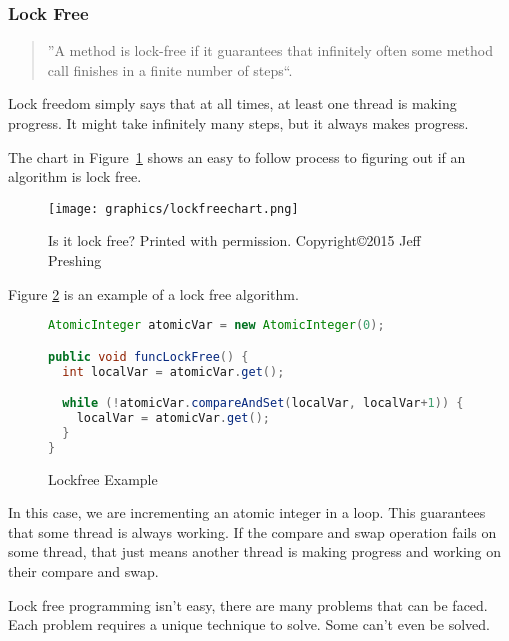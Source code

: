 \documentclass[letterpaper, 11pt]{article}
\begin{document}
\subsubsection{Lock Free}
\begin{quotation}
	''A method is lock-free if it guarantees that infinitely often some method call finishes 
	in a finite number of steps``\citep[p. 60]{artofmulti}.
\end{quotation}

Lock freedom simply says that at all times, at least one thread is making progress. It might 
take infinitely many steps, but it always makes progress.  
\par\vspace{\baselineskip}

The chart in Figure~\ref{lockfreechart} shows an easy to follow process to figuring out if an algorithm is lock free.

\begin{figure}
    \centering
	\texttt{[image: graphics/lockfreechart.png]}
    \caption{Is it lock free? Printed with permission. Copyright\copyright 2015 Jeff Preshing}
    \citep{introlockfree} 
    \label{lockfreechart}
\end{figure}

Figure \ref{fig:lockfree_ex} is an example of a lock free algorithm.
\par\vspace{\baselineskip}

\begin{figure}
\begin{lstlisting}[language=Java]
AtomicInteger atomicVar = new AtomicInteger(0);

public void funcLockFree() {
  int localVar = atomicVar.get();

  while (!atomicVar.compareAndSet(localVar, localVar+1)) {
    localVar = atomicVar.get();
  }
}
\end{lstlisting} 
\caption{Lockfree Example} \label{fig:lockfree_ex}
\citep{concurrencyfreaks}
\end{figure}


In this case, we are incrementing an atomic integer in a loop. This guarantees that 
some thread is always working. If the compare and swap operation fails on some thread, 
that just means another thread is making progress and working on their compare and swap.
\par\vspace{\baselineskip}

Lock free programming isn't easy, there are many problems that can be faced. Each 
problem requires a unique technique to solve. Some can't even be solved. 
\par\vspace{\baselineskip}
\end{document}
